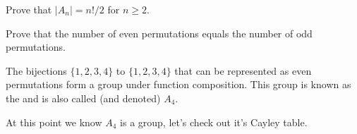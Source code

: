 \documentclass{ximera}
\begin{document}
\begin{exercise}
  Prove that $|A_n| = n!/2$ for $n\ge 2$.
  \begin{hint}
    Prove that the number of even permutations equals the number of
    odd permutations.
  \end{hint}
\end{exercise}


\begin{example}
  The bijections $\{1,2,3,4\}$ to $\{1,2,3,4\}$ that can be represented
  as even permutations form a group under function composition. This
  group is known as the  and is
  also called (and denoted) $A_4$.


  At this point we know $A_4$ is a group, let's check out it's Cayley
  table.


\end{example}
\end{document}
